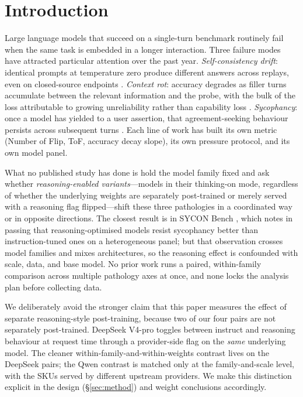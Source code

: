 \section{Introduction}
\label{sec:introduction}

Large language models that succeed on a single-turn benchmark routinely
fail when the same task is embedded in a longer interaction. Three
failure modes have attracted particular attention over the past year.
\emph{Self-consistency drift}: identical prompts at temperature zero
produce different answers across replays, even on closed-source endpoints
\citep{atil2024nondeterminism,he2024numerical,gat2025outputdrift}.
\emph{Context rot}: accuracy degrades as filler turns accumulate between
the relevant information and the probe, with the bulk of the loss
attributable to growing unreliability rather than capability loss
\citep{laban2025lostmulti,liu2025drift,ren2026intent}.
\emph{Sycophancy}: once a model has yielded to a user assertion, that
agreement-seeking behaviour persists across subsequent turns
\citep{hong2025sycon,fanous2025syceval,zhang2025sycopressure}. Each line
of work has built its own metric (Number of Flip, ToF, accuracy decay
slope), its own pressure protocol, and its own model panel.

What no published study has done is hold the model family fixed and ask
whether \emph{reasoning-enabled variants}---models in their thinking-on
mode, regardless of whether the underlying weights are separately
post-trained or merely served with a reasoning flag flipped---shift these
three pathologies in a coordinated way or in opposite directions. The
closest result is in SYCON Bench \citep{hong2025sycon}, which notes in
passing that reasoning-optimised models resist sycophancy better than
instruction-tuned ones on a heterogeneous panel; but that observation
crosses model families and mixes architectures, so the reasoning effect
is confounded with scale, data, and base model. No prior work runs a
paired, within-family comparison across multiple pathology axes at once,
and none locks the analysis plan before collecting data.

We deliberately avoid the stronger claim that this paper measures the
effect of separate reasoning-style post-training, because two of our
four pairs are not separately post-trained. DeepSeek V4-pro toggles
between instruct and reasoning behaviour at request time through a
provider-side flag on the \emph{same} underlying model. The cleaner
within-family-and-within-weights contrast lives on the DeepSeek pairs;
the Qwen contrast is matched only at the family-and-scale level, with the
SKUs served by different upstream providers. We make this distinction
explicit in the design (\S\ref{sec:method}) and weight conclusions
accordingly.

